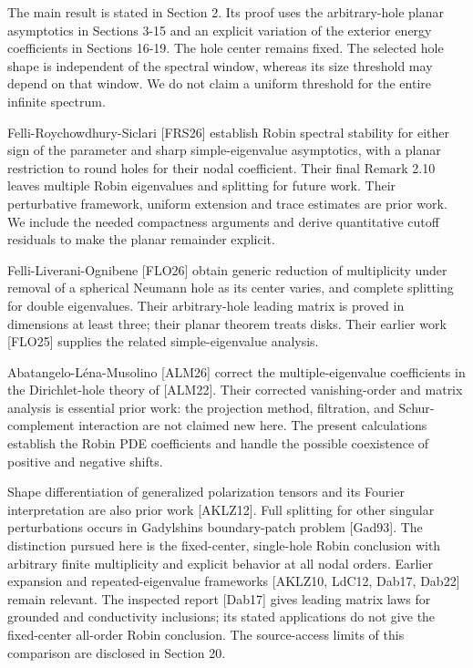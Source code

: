 \documentclass[11pt]{article}
\begin{document}
The main result is stated in Section 2. Its proof uses the
arbitrary-hole planar asymptotics in Sections 3-15 and an explicit
variation of the exterior energy coefficients in Sections 16-19. The
hole center remains fixed. The selected hole shape is independent of the
spectral window, whereas its size threshold may depend on that window.
We do not claim a uniform threshold for the entire infinite spectrum.

Felli-Roychowdhury-Siclari {[}FRS26{]} establish Robin spectral
stability for either sign of the parameter and sharp simple-eigenvalue
asymptotics, with a planar restriction to round holes for their nodal
coefficient. Their final Remark 2.10 leaves multiple Robin eigenvalues
and splitting for future work. Their perturbative framework, uniform
extension and trace estimates are prior work. We include the needed
compactness arguments and derive quantitative cutoff residuals to make
the planar remainder explicit.

Felli-Liverani-Ognibene {[}FLO26{]} obtain generic reduction of
multiplicity under removal of a spherical Neumann hole as its center
varies, and complete splitting for double eigenvalues. Their
arbitrary-hole leading matrix is proved in dimensions at least three;
their planar theorem treats disks. Their earlier work {[}FLO25{]}
supplies the related simple-eigenvalue analysis.

Abatangelo-Léna-Musolino {[}ALM26{]} correct the multiple-eigenvalue
coefficients in the Dirichlet-hole theory of {[}ALM22{]}. Their
corrected vanishing-order and matrix analysis is essential prior work:
the projection method, filtration, and Schur-complement interaction are
not claimed new here. The present calculations establish the Robin PDE
coefficients and handle the possible coexistence of positive and
negative shifts.

Shape differentiation of generalized polarization tensors and its
Fourier interpretation are also prior work {[}AKLZ12{]}. Full splitting
for other singular perturbations occurs in
Gadyl\textquotesingle shin\textquotesingle s boundary-patch problem
{[}Gad93{]}. The distinction pursued here is the fixed-center,
single-hole Robin conclusion with arbitrary finite multiplicity and
explicit behavior at all nodal orders. Earlier expansion and
repeated-eigenvalue frameworks {[}AKLZ10, LdC12, Dab17, Dab22{]} remain
relevant. The inspected report {[}Dab17{]} gives leading matrix laws for
grounded and conductivity inclusions; its stated applications do not
give the fixed-center all-order Robin conclusion. The source-access
limits of this comparison are disclosed in Section 20.
\end{document}
